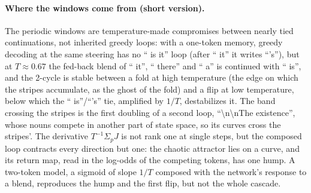 \paragraph{Where the windows come from (short version).} The periodic windows are temperature-made compromises
between nearly tied continuations, not inherited greedy loops: with a one-token memory, greedy decoding at the same
steering has no `` is it'' loop (after `` it'' it writes ``'s''), but at $T\approx0.67$ the fed-back blend of
`` it'', `` there'' and `` a'' is continued with `` is'', and the 2-cycle is stable between a fold at high
temperature (the edge on which the stripes accumulate, as the ghost of the fold) and a flip at low temperature,
below which the `` is''/``'s'' tie, amplified by $1/T$, destabilizes it. The band crossing the stripes is the first
doubling of a second loop, ``\textbackslash n\textbackslash nThe existence'', whose nouns compete in another part
of state space, so its curves cross the stripes'. The derivative $T^{-1}\Sigma_pJ$ is not rank one at single
steps, but the composed loop contracts every direction but one: the chaotic attractor lies on a curve, and its
return map, read in the log-odds of the competing tokens, has one hump. A two-token model, a sigmoid of slope $1/T$
composed with the network's response to a blend, reproduces the hump and the first flip, but not the whole cascade.
